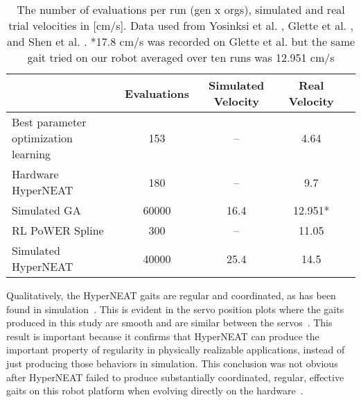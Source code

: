 \begin{table}
\caption{The number of evaluations per run (gen x orgs), simulated and real trial velocities in [cm/s]. Data used from Yosinksi et al. \cite{yos:clune}, Glette et al. \cite{glette}, and Shen et al. \cite{haocheng}.
*17.8 cm/s was recorded on Glette et al. \cite{glette} but the same gait tried on our robot averaged over ten runs was 12.951 cm/s}  %
\begin{center}
\begin{tabular}{|l|c|c|c|c|}
\hline
                                         & Evaluations  & Simulated Velocity  & Real Velocity \\
\hline
Best parameter optimization learning    &153    & --    & 4.64 \\
\hline
Hardware HyperNEAT                  & 180         & --         &   9.7     \\
\hline
Simulated GA              & 60000       & 16.4       &   12.951*     \\
\hline
RL PoWER Spline                          & 300         & --         &   11.05 \\
\hline
Simulated HyperNEAT                      & 40000       & 25.4       &   14.5 \\
\hline
\end{tabular}
\end{center}
\label{resultsTable}
\end{table}


Qualitatively, the HyperNEAT gaits are regular and coordinated, as has been found in simulation~\cite{clune2009evolving, clune2011performance}. This is evident in the servo position plots where the gaits produced in this study are smooth and are similar between the servos~. This result is important because it confirms that HyperNEAT can produce the important property of regularity in physically realizable applications, instead of just producing those behaviors in simulation. This conclusion was not obvious after HyperNEAT failed to produce substantially coordinated, regular, effective gaits on this robot platform when evolving directly on the hardware~\cite{yos:clune}. 

